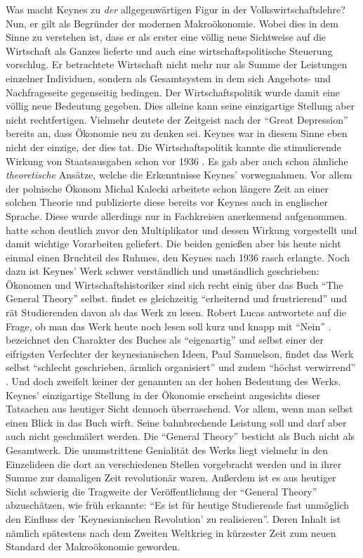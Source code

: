 Was macht Keynes zu \textit{der} allgegenwärtigen Figur in der Volkswirtschaftslehre? Nun, er gilt als Begründer der modernen Makroökonomie. Wobei dies in dem Sinne zu verstehen ist, dass er als erster eine völlig neue Sichtweise auf die Wirtschaft als Ganzes lieferte und auch eine wirtschaftspolitische Steuerung vorschlug. Er betrachtete Wirtschaft nicht mehr nur als Summe der Leistungen einzelner Individuen, sondern als Gesamtsystem in dem sich Angebots- und Nachfrageseite gegenseitig bedingen. Der Wirtschaftspolitik wurde damit eine völlig neue Bedeutung gegeben. Dies alleine kann seine einzigartige Stellung aber nicht rechtfertigen. Vielmehr deutete der Zeitgeist nach der "`Great Depression"' bereits an, dass Ökonomie neu zu denken sei. Keynes war in diesem Sinne eben nicht der einzige, der dies tat. Die Wirtschaftspolitik kannte die stimulierende Wirkung von Staatsausgaben schon vor 1936 \parencite{Fishback2010}. Es gab aber auch schon ähnliche \textit{theoretische} Ansätze, welche die Erkenntnisse Keynes' vorwegnahmen. Vor allem der polnische Ökonom Michal Kalecki arbeitete schon längere Zeit an einer solchen Theorie und publizierte diese \parencite{Kalecki1935} bereits vor Keynes auch in englischer Sprache. Diese wurde allerdings nur in Fachkreisen anerkennend aufgenommen. \textcite{Kahn1931} hatte schon deutlich zuvor den Multiplikator und dessen Wirkung vorgestellt und damit wichtige Vorarbeiten geliefert. Die beiden genießen aber bis heute nicht einmal einen Bruchteil des Ruhmes, den Keynes nach 1936 rasch erlangte. Noch dazu ist Keynes' Werk schwer verständlich und umständlich geschrieben: Ökonomen und Wirtschaftshistoriker sind sich recht einig über das Buch "`The General Theory"' selbst. \textcite [S. 31]{Mankiw2006} findet es gleichzeitig "`erheiternd und frustrierend"' und rät Studierenden davon ab das Werk zu lesen. Robert Lucas antwortete auf die Frage, ob man das Werk heute noch lesen soll kurz und knapp mit "`Nein"' \parencite{Lucas2013}. \textcite[S. 429]{Rosner2012} bezeichnet den Charakter des Buches als "`eigenartig"' und selbst einer der eifrigsten Verfechter der keynesianischen Ideen, Paul Samuelson, findet das Werk selbst "`schlecht geschrieben, ärmlich organisiert"' und zudem "`höchst verwirrend"' \parencite[S. 190]{Samuelson1946}. Und doch zweifelt keiner der genannten an der hohen Bedeutung des Werks. Keynes' einzigartige Stellung in der Ökonomie erscheint angesichts dieser Tatsachen aus heutiger Sicht dennoch überraschend. Vor allem, wenn man selbst einen Blick in das Buch wirft. Seine bahnbrechende Leistung soll und darf aber auch nicht geschmälert werden. Die "`General Theory"' besticht als Buch nicht als Gesamtwerk. Die unumstrittene Genialität des Werks liegt vielmehr in den Einzelideen die dort an verschiedenen Stellen vorgebracht werden und in ihrer Summe zur damaligen Zeit revolutionär waren. Außerdem ist es aus heutiger Sicht schwierig die Tragweite der Veröffentlichung der "`General Theory"' abzuschätzen, wie \textcite[S. 187]{Samuelson1946} früh erkannte: "`Es ist für heutige Studierende fast unmöglich den Einfluss der 'Keynesianischen Revolution' zu realisieren"'. Deren Inhalt ist nämlich spätestens nach dem Zweiten Weltkrieg in kürzester Zeit zum neuen Standard der Makroökonomie geworden. 

